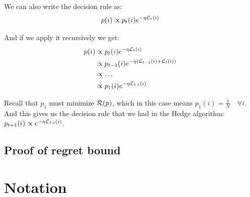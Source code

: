 \documentclass[11pt]{article}
\newtheorem{theorem}{Theorem}[section]
\newtheorem{lemma}[theorem]{Lemma}
\theoremstyle{definition}
\newtheorem{definition}[theorem]{Definition}
\theoremstyle{definition}
\newtheorem{example}[theorem]{Example}
\newcommand{\pth}[1]{\left( #1\right)}                 %
\begin{document}
We can also write the decision rule as:
\begin{equation*}
p(i) \propto p_t(i) e^{-\eta {\mathcal L}_t(i)}
\end{equation*}

And if we apply it recursively we get:
\begin{equation*}
\begin{aligned}
p(i) &\propto p_t(i) e^{-\eta \L_t(i)}
\\
&\propto p_{t-1}(i) e^{-\eta \pth{ \L_{t-1}(i) + \L_t(i) }}
\\
&\propto \dots
\\
&\propto p_{1}(i) e^{-\eta \L_{1:t}(i)}
\end{aligned}
\end{equation*}

Recall that $p_1$ must minimize $\mathcal R(p)$, which in this case means $ p_1(i) = \frac{1}{N} \quad \forall i $. And this gives us the decision rule that we had in the Hedge algorithm: $ p_{t+1}(i) \propto e^{-\eta {\mathcal L}_{1:t}(i)} $.



\subsection{Proof of regret bound}



%
%
%

\section{Notation }
\end{document}
